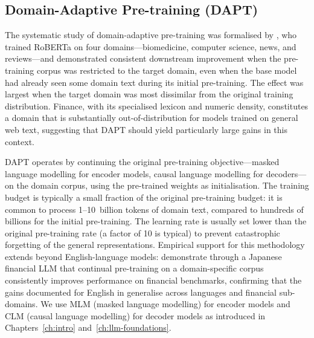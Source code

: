 \subsection{Domain-Adaptive Pre-training (DAPT)}
\label{sec:ch08-dapt}

The systematic study of domain-adaptive pre-training was formalised by
\citet{gururangan2020dont}, who trained RoBERTa on four domains---biomedicine,
computer science, news, and reviews---and demonstrated consistent downstream
improvement when the pre-training corpus was restricted to the target domain,
even when the base model had already seen some domain text during its initial
pre-training.  The effect was largest when the target domain was most dissimilar
from the original training distribution.  Finance, with its specialised lexicon
and numeric density, constitutes a domain that is substantially out-of-distribution
for models trained on general web text, suggesting that DAPT should yield
particularly large gains in this context.

DAPT operates by continuing the original pre-training objective---masked language
modelling for encoder models, causal language modelling for decoders---on the
domain corpus, using the pre-trained weights as initialisation.  The training
budget is typically a small fraction of the original pre-training budget: it is
common to process 1--10~billion tokens of domain text, compared to hundreds of
billions for the initial pre-training.  The learning rate is usually set lower
than the original pre-training rate (a factor of 10 is typical) to prevent
catastrophic forgetting of the general representations.  Empirical support for
this methodology extends beyond English-language models: \citet{Hirano2024a}
demonstrate through a Japanese financial LLM that continual pre-training on a
domain-specific corpus consistently improves performance on financial benchmarks,
confirming that the gains documented for English in \citet{gururangan2020dont}
generalise across languages and financial sub-domains.
We use MLM (masked language modelling) for encoder models and CLM (causal language modelling) for decoder models as introduced in Chapters~\ref{ch:intro} and~\ref{ch:llm-foundations}.

